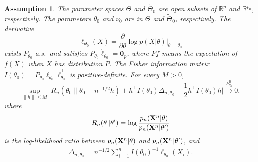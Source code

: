 \documentclass[11pt]{article}
\newcommand{\myT}{\intercal}
\theoremstyle{plain}
\newtheorem{assumption}{\quad\quad Assumption}
\theoremstyle{definition}
\theoremstyle{remark}
\begin{document}
\begin{assumption}\label{Assumption1}
    The parameter spaces $\Theta$ and $\tilde{\Theta}_0$ are open subsets of $\mathbb{R}^p$ and $\mathbb{R}^{p_0}$, respectively.
    The parameters $\theta_0$ and $\nu_0$ are in $\Theta$ and $\tilde{\Theta}_0$, respectively.
    The derivative 
$$\dot{\ell}_{\theta_0}(X)=\frac{\partial}{\partial \theta}\log p(X|\theta)\Big|_{\theta=\theta_0}$$
exists $P_{\theta_0}$-a.s.\ and satisfies $P_{\theta_0}\dot{\ell}_{\theta_0}=\mathbf{0}_p$, where $P f$ means the expectation of $f(X)$ when $X$ has distribution $P$.
The Fisher information matrix $I(\theta_0)=P_{\theta_0}\dot{\ell}_{\theta_0}\dot{\ell}_{\theta_0}^\myT $ is positive-definite.
For every $M>0$,
    \begin{equation*}
        \sup_{\|h\|\leq M}\Big|
        R_n( \theta_0\|\theta_0 + n^{-1/2 }h )
        +h^\myT  I(\theta_0)\Delta_{n,\theta_0}-\frac{1}{2}h^\myT  I(\theta_0) h
         \Big|\xrightarrow{P^n_{\theta_0}}0,
    \end{equation*}
    where 
    \begin{align*}
        R_n (\theta\| \theta' )= \log \frac{ p_n(\mathbf{X}^{n}|\theta)}{ p_n(\mathbf{X}^{n}|\theta') }
    \end{align*}
    is the log-likelihood ratio between $p_n(\mathbf{X}^{n} | \theta )$ and $ p_n(\mathbf{X}^{n} | \theta' )$,
    and 
    \begin{align*}
    \Delta_{n,\theta_0}=n^{-1/2}\sum_{i=1}^n I(\theta_0)^{-1}\dot{\ell}_{\theta_0}(X_i).
    \end{align*}
\end{assumption}     
\end{document}
